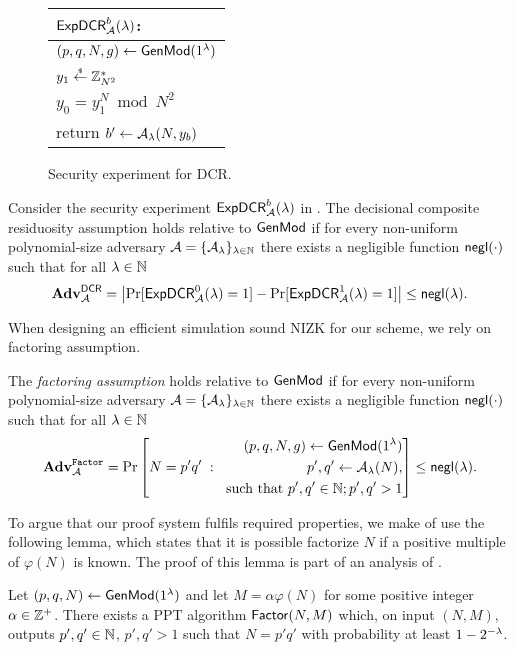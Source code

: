 \begin{figure}[h]
\begin{center}
\begin{tabular}{l}
$\mathsf{ExpDCR}_{\mathcal{A}}^{b}(\lambda)$: \\
\hline
$(p, q, N, g) \leftarrow \mathsf{GenMod}(1{^{\lambda}})$ \\
$y_1 \stackrel{{\scriptscriptstyle\$}}{\leftarrow} \mathbb{Z}_{N^2}^*$ \\
$y_0 = y_1^N \bmod N^2$\\
return	$b' \leftarrow \mathcal{A}_{\lambda}(N,y_b)$
\end{tabular}
\end{center}
\caption{\label{fig:dcr}Security experiment for DCR.}
\end{figure}



\begin{definition}
Consider the security experiment $\mathsf{ExpDCR}_{\mathcal{A}}^{b}(\lambda)$ in .
The decisional composite residuosity assumption holds relative to $\mathsf{GenMod}$ if for every non-uniform polynomial-size adversary $\mathcal{A} = \{\mathcal{A}_{\lambda}\}_{\lambda \in \mathbb{N}}$ there exists a negligible function $\mathsf{negl}(\cdot)$ such that for all $\lambda \in \mathbb{N}$ 
\[\mathbf{Adv}^\mathsf{DCR}_{\mathcal{A}} = \left| \Pr[\mathsf{ExpDCR}_{\mathcal{A}}^{0}(\lambda) = 1] - \Pr[\mathsf{ExpDCR}_{\mathcal{A}}^{1}(\lambda) = 1] \right| \leq \mathsf{negl}(\lambda).\]
\end{definition} 


When designing an efficient simulation sound NIZK for our scheme, we rely on factoring assumption. 

\begin{definition}
The \emph{factoring assumption} holds relative to $\mathsf{GenMod}$ if  for every non-uniform polynomial-size adversary $\mathcal{A} = \{\mathcal{A}_{\lambda}\}_{\lambda \in \mathbb{N}}$ there exists a negligible function $\mathsf{negl}(\cdot)$ such that for all $\lambda \in \mathbb{N}$ 
\[ \mathbf{Adv}_{\mathcal{A}}^{\mathtt{Factor}} = 
\Pr\left[ 
		N = p'q'
		\;:\;
    \begin{aligned}
    	(p, q, N, g) \leftarrow \mathsf{GenMod}(1{^{\lambda}}) \\
			p',q' \leftarrow \mathcal{A}_{\lambda}(N), \\
			\text{ such that }  p', q' \in \mathbb{N}; p', q'>1
    \end{aligned}
    \right] 
\leq \mathsf{negl}(\lambda). 
\]
\end{definition}

To argue that our proof system fulfils required properties, we make of use the following lemma, which states that it is possible factorize $N$ if a positive multiple of $\varphi(N)$ is known. The proof of this lemma is part of an analysis of \cite[Theorem 8.50]{books/crc/KatzLindell2014}.
\begin{lemma}\label{factor-lemma}
Let $(p,q,N)  \leftarrow \mathsf{GenMod}(1{^{\lambda}})$ and let $M = \alpha\varphi(N)$ for some positive integer $\alpha\in \mathbb{Z}^+$. There exists a PPT algorithm $\mathsf{Factor}(N, M)$ which, on input $(N,M)$, outputs $p',q' \in \mathbb{N}$, $p', q'>1$ such that $N = p'q'$ with probability at least $1-2^{-\lambda}$. 
\end{lemma}


